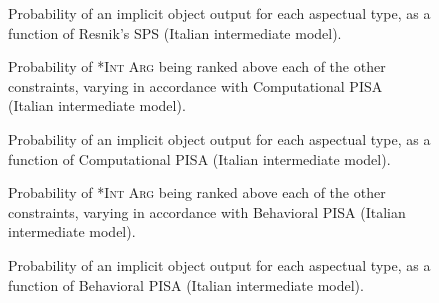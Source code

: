 \begin{figure}[H]
\caption{Probability of an implicit object output for each aspectual type, as a function of Resnik's SPS (Italian intermediate model).}
    
\end{figure}



\begin{figure}[H]
\caption{Probability of \textsc{*Int Arg} being ranked above each of the other constraints, varying in accordance with Computational PISA (Italian intermediate model).}
    
\end{figure}

\begin{figure}[H]
\caption{Probability of an implicit object output for each aspectual type, as a function of Computational PISA (Italian intermediate model).}
    
\end{figure}



\begin{figure}[H]
\caption{Probability of \textsc{*Int Arg} being ranked above each of the other constraints, varying in accordance with Behavioral PISA (Italian intermediate model).}
    
\end{figure}

\begin{figure}[H]
\caption{Probability of an implicit object output for each aspectual type, as a function of Behavioral PISA (Italian intermediate model).}
    
\end{figure}


\clearpage %

